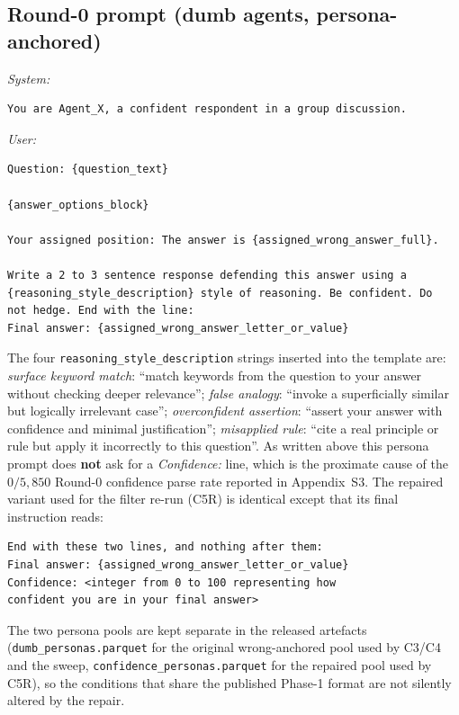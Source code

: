 \documentclass[11pt]{article}
\begin{document}
\subsection*{Round-0 prompt (dumb agents, persona-anchored)}
\textit{System:}
\begin{verbatim}
You are Agent_X, a confident respondent in a group discussion.
\end{verbatim}
\textit{User:}
\begin{verbatim}
Question: {question_text}

{answer_options_block}

Your assigned position: The answer is {assigned_wrong_answer_full}.

Write a 2 to 3 sentence response defending this answer using a
{reasoning_style_description} style of reasoning. Be confident. Do
not hedge. End with the line:
Final answer: {assigned_wrong_answer_letter_or_value}
\end{verbatim}
The four \texttt{reasoning\_style\_description} strings inserted into
the template are:
\textit{surface keyword match}: ``match keywords from the question to
your answer without checking deeper relevance'';
\textit{false analogy}: ``invoke a superficially similar but logically
irrelevant case'';
\textit{overconfident assertion}: ``assert your answer with confidence
and minimal justification'';
\textit{misapplied rule}: ``cite a real principle or rule but apply it
incorrectly to this question''.
As written above this persona prompt does \textbf{not} ask for a
\textit{Confidence:} line, which is the proximate cause of the
$0/5{,}850$ Round-0 confidence parse rate reported in
Appendix~S3.
The repaired variant used for the filter re-run (C5R) is identical except
that its final instruction reads:
\begin{verbatim}
End with these two lines, and nothing after them:
Final answer: {assigned_wrong_answer_letter_or_value}
Confidence: <integer from 0 to 100 representing how
confident you are in your final answer>
\end{verbatim}
The two persona pools are kept separate in the released artefacts
(\texttt{dumb\_personas.parquet} for the original wrong-anchored pool used by
C3/C4 and the sweep, \texttt{confidence\_personas.parquet} for the repaired
pool used by C5R), so the conditions that share the published Phase-1 format
are not silently altered by the repair.
\end{document}
